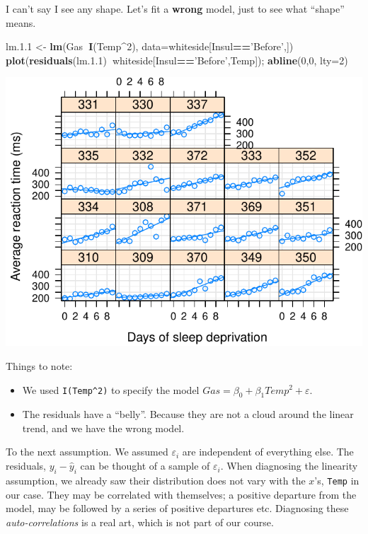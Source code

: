 \documentclass[]{book}
\newenvironment{Shaded}{\begin{snugshade}}{\end{snugshade}}
\newcommand{\DataTypeTok}[1]{\textcolor[rgb]{0.13,0.29,0.53}{#1}}
\newcommand{\DecValTok}[1]{\textcolor[rgb]{0.00,0.00,0.81}{#1}}
\newcommand{\FloatTok}[1]{\textcolor[rgb]{0.00,0.00,0.81}{#1}}
\newcommand{\KeywordTok}[1]{\textcolor[rgb]{0.13,0.29,0.53}{\textbf{#1}}}
\newcommand{\NormalTok}[1]{#1}
\newcommand{\OperatorTok}[1]{\textcolor[rgb]{0.81,0.36,0.00}{\textbf{#1}}}
\newcommand{\StringTok}[1]{\textcolor[rgb]{0.31,0.60,0.02}{#1}}
\providecommand{\tightlist}{%
  \setlength{\itemsep}{0pt}\setlength{\parskip}{0pt}}
\theoremstyle{definition}
\theoremstyle{definition}
\theoremstyle{definition}
\theoremstyle{remark}
\begin{document}
I can't say I see any shape.
Let's fit a \textbf{wrong} model, just to see what ``shape'' means.

\begin{Shaded}
\begin{Highlighting}[]
\NormalTok{lm.}\FloatTok{1.1}\NormalTok{ <-}\StringTok{ }\KeywordTok{lm}\NormalTok{(Gas}\OperatorTok{~}\KeywordTok{I}\NormalTok{(Temp}\OperatorTok{^}\DecValTok{2}\NormalTok{), }\DataTypeTok{data=}\NormalTok{whiteside[Insul}\OperatorTok{==}\StringTok{'Before'}\NormalTok{,])}
\KeywordTok{plot}\NormalTok{(}\KeywordTok{residuals}\NormalTok{(lm.}\FloatTok{1.1}\NormalTok{)}\OperatorTok{~}\NormalTok{whiteside[Insul}\OperatorTok{==}\StringTok{'Before'}\NormalTok{,Temp]); }\KeywordTok{abline}\NormalTok{(}\DecValTok{0}\NormalTok{,}\DecValTok{0}\NormalTok{, }\DataTypeTok{lty=}\DecValTok{2}\NormalTok{)}
\end{Highlighting}
\end{Shaded}

\includegraphics[width=0.5\linewidth]{Rcourse_files/figure-latex/unnamed-chunk-162-1}

Things to note:

\begin{itemize}
\tightlist
\item
  We used \texttt{I(Temp\^{}2)} to specify the model \(Gas=\beta_0 + \beta_1 Temp^2+ \varepsilon\).
\item
  The residuals have a ``belly''.
  Because they are not a cloud around the linear trend, and we have the wrong model.
\end{itemize}

To the next assumption.
We assumed \(\varepsilon_i\) are independent of everything else.
The residuals, \(y_i-\hat y_i\) can be thought of a sample of \(\varepsilon_i\).
When diagnosing the linearity assumption, we already saw their distribution does not vary with the \(x\)'s, \texttt{Temp} in our case.
They may be correlated with themselves; a positive departure from the model, may be followed by a series of positive departures etc.
Diagnosing these \emph{auto-correlations} is a real art, which is not part of our course.
\end{document}
